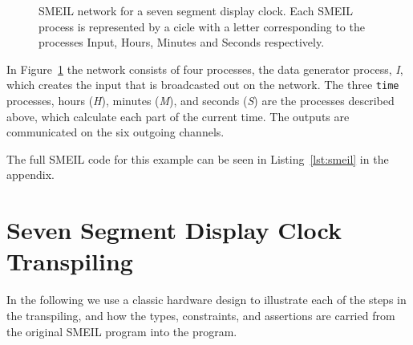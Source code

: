 \begin{figure}[!ht]
  \centering
  \caption{SMEIL network for a seven segment display clock. Each SMEIL process is represented by a cicle with a letter corresponding to the processes Input, Hours, Minutes and Seconds respectively.}
  \label{fig:smeil_network}
\end{figure}

In Figure~\ref{fig:smeil_network} the network consists of four processes, the data generator process, \textit{I}, which creates the input that is broadcasted out on the network. The three \texttt{time} processes, hours (\textit{H}), minutes (\textit{M}), and seconds (\textit{S}) are the processes described above, which calculate each part of the current time. The outputs are communicated on the six outgoing channels.

The full SMEIL code for this example can be seen in Listing~\ref{lst:smeil} in  the appendix.

\section{Seven Segment Display Clock Transpiling}
In the following we use a classic hardware design to illustrate each of the steps in the transpiling, and how the types, constraints, and assertions are carried from the original SMEIL program into the \cspm{} program.

